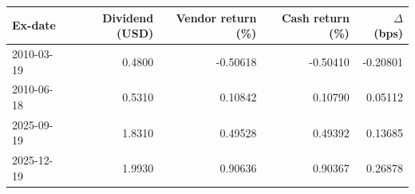 \begin{tabular}{lrrrr}
\toprule
Ex-date & Dividend (USD) & Vendor return (\%) & Cash return (\%) & $\Delta$ (bps) \\
\midrule
2010-03-19 & 0.4800 & -0.50618 & -0.50410 & -0.20801 \\
2010-06-18 & 0.5310 & 0.10842 & 0.10790 & 0.05112 \\
2025-09-19 & 1.8310 & 0.49528 & 0.49392 & 0.13685 \\
2025-12-19 & 1.9930 & 0.90636 & 0.90367 & 0.26878 \\
\bottomrule
\end{tabular}
